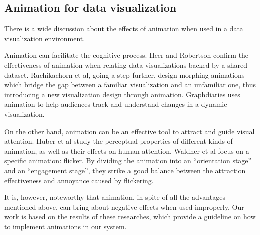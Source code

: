 \documentclass[review,journal]{vgtc}         %
\begin{document}
\subsection{Animation for data visualization}
There is a wide discussion about the effects of animation when used in a data visualization environment.\par 
Animation can facilitate the cognitive process. Heer and Robertson \cite{heer_animated_2007-1} confirm the effectiveness of animation when relating data visualizations backed by a shared dataset. Ruchikachorn et al\cite{ruchikachorn_learning_2015}, going a step further, design morphing animations which bridge the gap between a familiar visualization and an unfamiliar one, thus introducing a new visualization design through animation. Graphdiaries \cite{bach_graphdiaries:_2014} uses animation to help audiences track and understand changes in a dynamic visualization. \par
On the other hand, animation can be an effective tool to attract and guide visual attention. Huber et al \cite{huber_visualizing_2005} study the perceptual properties of different kinds of animation, as well as their effects on human attention. Waldner et al \cite{waldner_attractive_2014} focus on a specific animation: flicker. By dividing the animation into an “orientation stage” and an “engagement stage”, they strike a good balance between the attraction effectiveness and annoyance caused by flickering. \par
It is, however, noteworthy that animation, in spite of all the advantages mentioned above, can bring about negative effects when used improperly\cite{robertson_effectiveness_2008}. Our work is based on the results of these researches, which provide a guideline on how to implement animations in our system.\par
\end{document}
